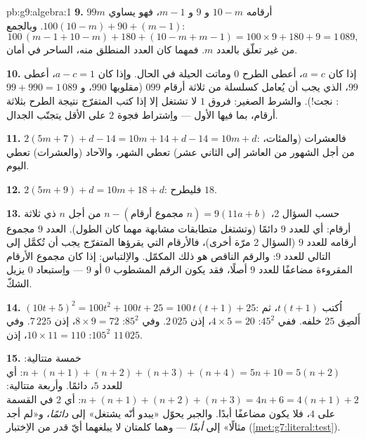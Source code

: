 \begin{solution}{pb:g9:algebra:1}
\textbf{9.}  $99m$ أرقامه $10 - m$ و $9$
و $m - 1$، فهو يساوي $100(10 - m) + 90 + (m - 1)$. وبالجمع:
\[
100\,(m - 1 + 10 - m) + 180 + (10 - m + m - 1)
= 100 \times 9 + 180 + 9 = 1\,089 ,
\]
من غير تعلّق بالعدد $m$. فمهما كان العدد المنطلق منه، الساحر في
أمان.

\textbf{10.} إذا كان $a = c$، أعطى الطرح $0$ وماتت الحيلة في
الحال. وإذا كان $a - c = 1$، أعطى $99$، الذي يجب أن يُعامل
كسلسلة من ثلاثة أرقام $099$ (مقلوبها $990$،
و $99 + 990 = 1\,089$: نجت!). والشرط الصغير: فروق
$1$ لا تشتغل إلا إذا كتب المتفرّج نتيجة الطرح بثلاثة أرقام، بما
فيها  الأول --- واِشتراط فجوة $2$ على الأقل يتجنّب
الجدال.

\textbf{11.} $2(5m + 7) + d - 14 = 10m + 14 + d - 14 =
10m + d$: فالعشرات (والمئات، من أجل الشهور من العاشر إلى الثاني
عشر) تعطي الشهر، والآحاد (والعشرات) تعطي اليوم.

\textbf{12.} $2(5m + 9) + d = 10m + 18 + d$: فليطرح $18$.

\textbf{13.} حسب السؤال 2، $n - (\text{مجموع أرقام } n) =
9(11a + b)$ من أجل $n$ ذي ثلاثة أرقام: أي  للعدد $9$
دائمًا (وتشتغل متطابقات مشابهة مهما كان الطول). 
العدد $9$ مجموع أرقامه  للعدد $9$ (السؤال 2 مرّة
أخرى)، فالأرقام التي يقرؤها المتفرّج يجب أن تُكمَّل إلى
 التالي للعدد $9$: والرقم الناقص هو ذلك المكمّل.
والاِلتباس: إذا كان مجموع الأرقام المقروءة مضاعفًا للعدد $9$
أصلًا، فقد يكون الرقم المشطوب $0$ أو $9$ --- واِستبعاد $0$ يزيل
الشكّ.

\textbf{14.} $(10t + 5)^2 = 100t^2 + 100t + 25 =
100\,t(t + 1) + 25$: اُكتب $t(t+1)$، ثم أَلصِق $25$ خلفه.
ففي $45^2$: $4 \times 5 = 20$، إذن $2\,025$. وفي $85^2$:
$8 \times 9 = 72$، إذن $7\,225$. وفي $105^2$: $10 \times 11 = 110$،
إذن $11\,025$.

\textbf{15.} خمسة متتالية: $n + (n+1) + (n+2) + (n+3) +
(n+4) = 5n + 10 = 5(n + 2)$: أي  للعدد $5$، دائمًا.
وأربعة متتالية: $n + (n+1) + (n+2) + (n+3) = 4n + 6 =
4(n + 1) + 2$: أي  $2$ في القسمة على $4$، فلا يكون
مضاعفًا أبدًا. والجبر يحوّل «يبدو أنّه يشتغل» إلى
\emph{دائمًا}، و«لم أجد مثالًا» إلى \emph{أبدًا} --- وهما كلمتان
لا يبلغهما أيّ قدر من الاِختبار
(\cref{met:g7:literal:test}).
\end{solution}
